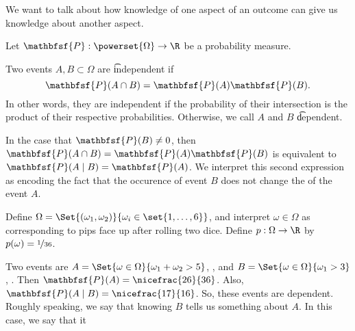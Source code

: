 
We want to talk about how knowledge of one aspect of an outcome can give us knowledge about another aspect.


Let $\mathbfsf{P} : \powerset{\Omega } \to \R $ be a probability measure.

Two events $A, B \subset \Omega $ are \t{independent} if
  \[
\mathbfsf{P} (A \cap B) = \mathbfsf{P} (A)\mathbfsf{P} (B).
  \]
In other words, they are independent if the probability of their intersection is the product of their respective probabilities.
Otherwise, we call $A$ and $B$ \t{dependent}.

In the case that $\mathbfsf{P} (B) \neq 0$, then $\mathbfsf{P} (A \cap B) = \mathbfsf{P} (A)\mathbfsf{P} (B)$ is equivalent to $\mathbfsf{P} (A \mid B) = \mathbfsf{P} (A)$.
We interpret this second expression as encoding the fact that the occurence of event $B$ does not change the  of the event $A$.


Define $\Omega  = \Set{(\omega _1, \omega _2)}{ \omega _i \in \set{1, \dots, 6}}$, and interpret $\omega  \in \Omega $ as corresponding to pips face up after rolling two dice.
Define $p: \Omega  \to \R $ by $p(\omega ) = \nicefrac{1}{36}$.

Two events are $A = \Set{\omega  \in \Omega }{ \omega _1 + \omega _2 > 5}$, , and $B = \Set{\omega  \in \Omega }{\omega _1 > 3}$, .
Then $\mathbfsf{P} (A) = \nicefrac{26}{36}$.
Also, $\mathbfsf{P} (A \mid B) = \nicefrac{17}{16}$.
So, these events are dependent.
Roughly speaking, we say that knowing $B$ tells us something about $A$.
In this case, we say that it 

\blankpage
